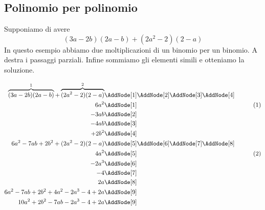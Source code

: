 \subsection{Polinomio per polinomio}
\begin{esempio}
Supponiamo di avere \[(3a-2b)(2a-b)+(2a^2-2)(2-a)\]
 In questo esempio abbiamo due moltiplicazioni di un binomio per un binomio. A destra i passaggi parziali. Infine sommiamo  gli elementi simili e otteniamo la soluzione.
 \begin{NodesList}
 	\begin{align*}
 		\overbrace{(3a-2b)(2a-b)}^{1}+\overbrace{(2a^2-2)(2-a)}^{2}&\nonumber\AddNode[1]\AddNode[2]\AddNode[3]\AddNode[4]\\
 		6a^2&\AddNode[1]&\tag{1}\\ 
 		-3ab&\AddNode[2]&\\
 		-4ab&\AddNode[3]&\\    
 		+2b^2&\AddNode[4]&\\
 		6a^2-7ab+2b^2+(2a^2-2)(2-a)&\nonumber\AddNode[5]\AddNode[6]\AddNode[7]\AddNode[8]\\
 		4a^2&\AddNode[5]&\tag{2}\\
 		-2a^3&\AddNode[6]&\\
 		-4 &\AddNode[7]&\\   
 		2a&\AddNode[8]&\\   
 		6a^2-7ab+2b^2+4a^2-2a^3-4+2a&\nonumber\AddNode[9]\\
 		10a^2+2b^2-7ab-2a^3-4+2a&\nonumber\AddNode[9]
 	\end{align*}
 \end{NodesList}
\end{esempio}
